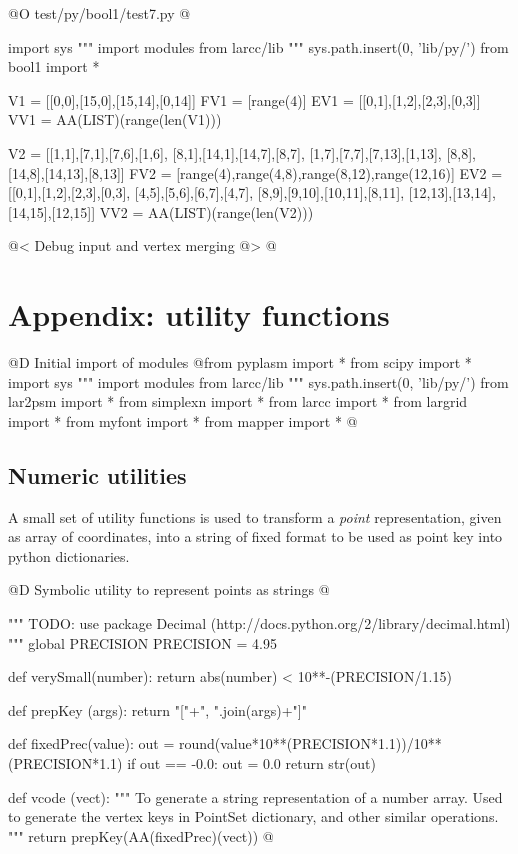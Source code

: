 \documentclass[11pt,oneside]{article}	%
\begin{document}
@O test/py/bool1/test7.py
@{
import sys
""" import modules from larcc/lib """
sys.path.insert(0, 'lib/py/')
from bool1 import *

V1 = [[0,0],[15,0],[15,14],[0,14]]
FV1 = [range(4)]
EV1 = [[0,1],[1,2],[2,3],[0,3]]
VV1 = AA(LIST)(range(len(V1)))

V2 = [[1,1],[7,1],[7,6],[1,6], [8,1],[14,1],[14,7],[8,7], [1,7],[7,7],[7,13],[1,13], [8,8],[14,8],[14,13],[8,13]]
FV2 = [range(4),range(4,8),range(8,12),range(12,16)]
EV2 = [[0,1],[1,2],[2,3],[0,3], [4,5],[5,6],[6,7],[4,7], [8,9],[9,10],[10,11],[8,11], [12,13],[13,14],[14,15],[12,15]]
VV2 = AA(LIST)(range(len(V2)))

@< Debug input and vertex merging @>
@}






\appendix
\section{Appendix: utility functions}
@D Initial import of modules
@{from pyplasm import *
from scipy import *
import sys
""" import modules from larcc/lib """
sys.path.insert(0, 'lib/py/')
from lar2psm import *
from simplexn import *
from larcc import *
from largrid import *
from myfont import *
from mapper import *
@}
\subsection{Numeric utilities}

A small set of utility functions is used to transform a \emph{point} representation, given as array of coordinates, into a string of fixed format to be used as point key into python dictionaries.

@D Symbolic utility to represent points as strings
@{""" TODO: use package Decimal (http://docs.python.org/2/library/decimal.html) """
global PRECISION
PRECISION = 4.95

def verySmall(number): return abs(number) < 10**-(PRECISION/1.15)

def prepKey (args): return "["+", ".join(args)+"]"

def fixedPrec(value):
	out = round(value*10**(PRECISION*1.1))/10**(PRECISION*1.1)
	if out == -0.0: out = 0.0
	return str(out)
	
def vcode (vect): 
	"""
	To generate a string representation of a number array.
	Used to generate the vertex keys in PointSet dictionary, and other similar operations.
	"""
	return prepKey(AA(fixedPrec)(vect))
@}




\end{document}
